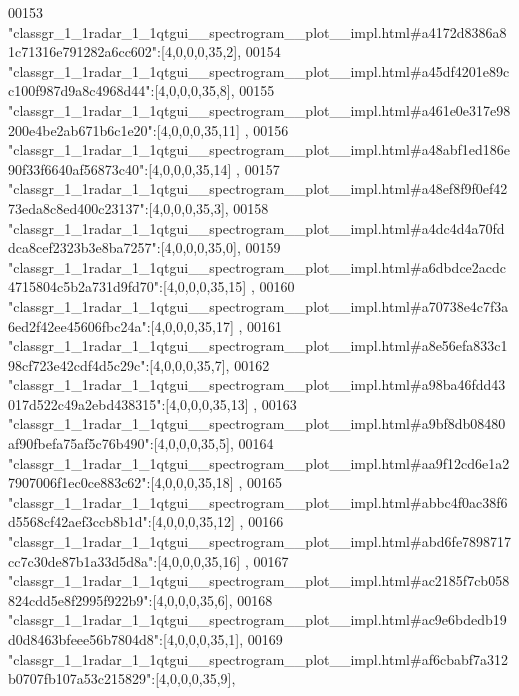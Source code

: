 \begin{DoxyCode}
00153 \textcolor{stringliteral}{"classgr\_1\_1radar\_1\_1qtgui\_\_spectrogram\_\_plot\_\_impl.html#a4172d8386a81c71316e791282a6cc602"}:[4,0,0,0,35,2],
00154 \textcolor{stringliteral}{"classgr\_1\_1radar\_1\_1qtgui\_\_spectrogram\_\_plot\_\_impl.html#a45df4201e89cc100f987d9a8c4968d44"}:[4,0,0,0,35,8],
00155 \textcolor{stringliteral}{"classgr\_1\_1radar\_1\_1qtgui\_\_spectrogram\_\_plot\_\_impl.html#a461e0e317e98200e4be2ab671b6c1e20"}:[4,0,0,0,35,11]
      ,
00156 \textcolor{stringliteral}{"classgr\_1\_1radar\_1\_1qtgui\_\_spectrogram\_\_plot\_\_impl.html#a48abf1ed186e90f33f6640af56873c40"}:[4,0,0,0,35,14]
      ,
00157 \textcolor{stringliteral}{"classgr\_1\_1radar\_1\_1qtgui\_\_spectrogram\_\_plot\_\_impl.html#a48ef8f9f0ef4273eda8c8ed400c23137"}:[4,0,0,0,35,3],
00158 \textcolor{stringliteral}{"classgr\_1\_1radar\_1\_1qtgui\_\_spectrogram\_\_plot\_\_impl.html#a4dc4d4a70fddca8cef2323b3e8ba7257"}:[4,0,0,0,35,0],
00159 \textcolor{stringliteral}{"classgr\_1\_1radar\_1\_1qtgui\_\_spectrogram\_\_plot\_\_impl.html#a6dbdce2acdc4715804c5b2a731d9fd70"}:[4,0,0,0,35,15]
      ,
00160 \textcolor{stringliteral}{"classgr\_1\_1radar\_1\_1qtgui\_\_spectrogram\_\_plot\_\_impl.html#a70738e4c7f3a6ed2f42ee45606fbc24a"}:[4,0,0,0,35,17]
      ,
00161 \textcolor{stringliteral}{"classgr\_1\_1radar\_1\_1qtgui\_\_spectrogram\_\_plot\_\_impl.html#a8e56efa833c198cf723e42cdf4d5c29c"}:[4,0,0,0,35,7],
00162 \textcolor{stringliteral}{"classgr\_1\_1radar\_1\_1qtgui\_\_spectrogram\_\_plot\_\_impl.html#a98ba46fdd43017d522c49a2ebd438315"}:[4,0,0,0,35,13]
      ,
00163 \textcolor{stringliteral}{"classgr\_1\_1radar\_1\_1qtgui\_\_spectrogram\_\_plot\_\_impl.html#a9bf8db08480af90fbefa75af5c76b490"}:[4,0,0,0,35,5],
00164 \textcolor{stringliteral}{"classgr\_1\_1radar\_1\_1qtgui\_\_spectrogram\_\_plot\_\_impl.html#aa9f12cd6e1a27907006f1ec0ce883c62"}:[4,0,0,0,35,18]
      ,
00165 \textcolor{stringliteral}{"classgr\_1\_1radar\_1\_1qtgui\_\_spectrogram\_\_plot\_\_impl.html#abbc4f0ac38f6d5568cf42aef3ccb8b1d"}:[4,0,0,0,35,12]
      ,
00166 \textcolor{stringliteral}{"classgr\_1\_1radar\_1\_1qtgui\_\_spectrogram\_\_plot\_\_impl.html#abd6fe7898717cc7c30de87b1a33d5d8a"}:[4,0,0,0,35,16]
      ,
00167 \textcolor{stringliteral}{"classgr\_1\_1radar\_1\_1qtgui\_\_spectrogram\_\_plot\_\_impl.html#ac2185f7cb058824cdd5e8f2995f922b9"}:[4,0,0,0,35,6],
00168 \textcolor{stringliteral}{"classgr\_1\_1radar\_1\_1qtgui\_\_spectrogram\_\_plot\_\_impl.html#ac9e6bdedb19d0d8463bfeee56b7804d8"}:[4,0,0,0,35,1],
00169 \textcolor{stringliteral}{"classgr\_1\_1radar\_1\_1qtgui\_\_spectrogram\_\_plot\_\_impl.html#af6cbabf7a312b0707fb107a53c215829"}:[4,0,0,0,35,9],

\end{DoxyCode}
